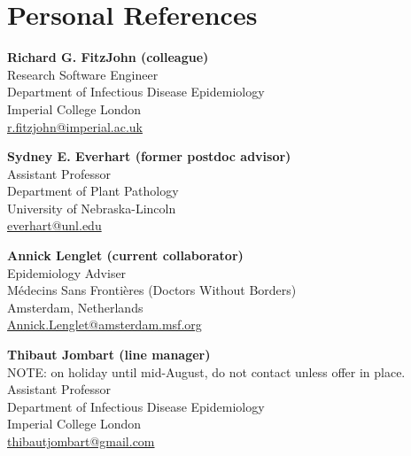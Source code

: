 \documentclass[10pt,letterpaper,roman]{moderncv} %
\begin{document}
\clearpage


\section{Personal References}

\textbf{Richard G. FitzJohn (colleague)}\\
Research Software Engineer\\
Department of Infectious Disease Epidemiology\\
Imperial College London\\
\href{mailto:r.fitzjohn@imperial.ac.uk?subject=Reference for Zhian N. Kamvar}{r.fitzjohn@imperial.ac.uk}

\bigskip

\textbf{Sydney E. Everhart (former postdoc advisor)}\\
Assistant Professor\\
Department of Plant Pathology\\
University of Nebraska-Lincoln\\
\href{mailto:everhart@unl.edu?subject=Reference for Zhian N. Kamvar}{everhart@unl.edu}

\bigskip

\textbf{Annick Lenglet (current collaborator)}\\
Epidemiology Adviser\\
M\'{e}decins Sans Fronti\`{e}res (Doctors Without Borders)\\ 
Amsterdam, Netherlands\\
\href{mailto:Annick.Lenglet@amsterdam.msf.org?subject=Reference for Zhian N. Kamvar}{Annick.Lenglet@amsterdam.msf.org}

\bigskip

\textbf{Thibaut Jombart (line manager)}\\
NOTE: on holiday until mid-August, do not contact unless offer in place.\\
Assistant Professor\\
Department of Infectious Disease Epidemiology\\
Imperial College London\\
\href{mailto:thibautjombart@gmail.com?subject=Reference for Zhian N. Kamvar}{thibautjombart@gmail.com}
\end{document}
